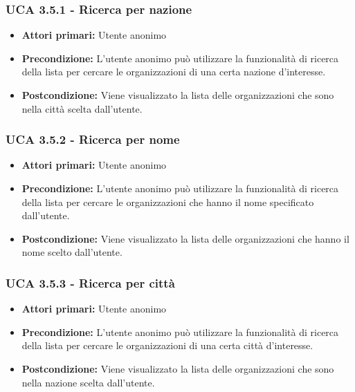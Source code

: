 \subsubsection{UCA 3.5.1 - Ricerca per nazione}%
\begin{itemize}
	\item \textbf{Attori primari:} Utente anonimo
	\item \textbf{Precondizione:} L'utente anonimo può utilizzare la funzionalità di ricerca della lista per cercare le organizzazioni di una certa nazione d'interesse.
	\item \textbf{Postcondizione:} Viene visualizzato la lista delle organizzazioni che sono nella città scelta dall'utente.
\end{itemize}

\subsubsection{UCA 3.5.2 - Ricerca per nome}%
\begin{itemize}
	\item \textbf{Attori primari:} Utente anonimo
	\item \textbf{Precondizione:} L'utente anonimo può utilizzare la funzionalità di ricerca della lista per cercare le organizzazioni che hanno il nome specificato dall'utente.
	\item \textbf{Postcondizione:} Viene visualizzato la lista delle organizzazioni che hanno il nome scelto dall'utente.
\end{itemize}

\subsubsection{UCA 3.5.3 - Ricerca per città}%
\begin{itemize}
	\item \textbf{Attori primari:} Utente anonimo
	\item \textbf{Precondizione:} L'utente anonimo può utilizzare la funzionalità di ricerca della lista per cercare le organizzazioni di una certa città d'interesse.
	\item \textbf{Postcondizione:} Viene visualizzato la lista delle organizzazioni che sono nella nazione scelta dall'utente.
\end{itemize}

